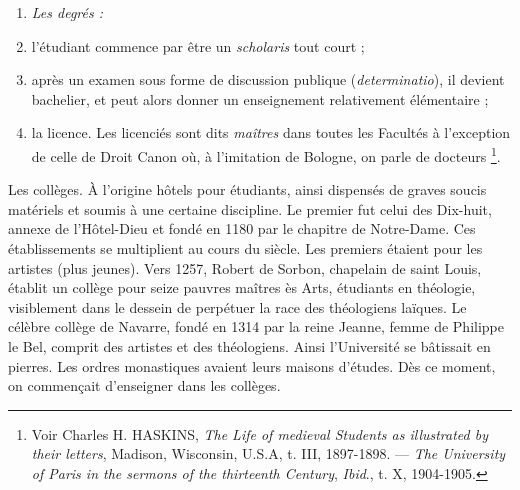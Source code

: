 \documentclass[french,twoside]{book} %
\newlength{\listmod}
\newcommand{\listhead}[1]{\hspace{-1\listmod}\emph{#1}}
\def\bignobreak{\ifdim\lastskip<\bigskipamount
  \removelastskip\nopagebreak\bigskip\fi}
\newcommand{\labelblock}[1]{\bigbreak{\color{rubric}\noindent\textbf{#1}\par}\bignobreak}
\begin{document}
\begin{enumerate}[itemsep=0pt,]
\item[]\listhead{Les degrés :}
\item l’étudiant commence par être un {\itshape scholaris} tout court ;
\item après un examen sous forme de discussion publique ({\itshape determinatio}), il devient bachelier, et peut alors donner un enseignement relativement élémentaire ;
\item la licence. Les licenciés sont dits \emph{maîtres} dans toutes les Facultés à l’exception de celle de Droit Canon où, à l’imitation de Bologne, on parle de docteurs \footnote{ Voir Charles H. HASKINS, {\itshape The Life of medieval Students as illustrated by their letters}, Madison, Wisconsin, U.S.A, t. III, 1897-1898. — {\itshape The University of Paris in the sermons of the thirteenth Century}, {\itshape Ibid}., t. X, 1904-1905.}.

\end{enumerate}\noindent Les collèges. À l’origine hôtels pour étudiants, ainsi dispensés de graves soucis matériels et soumis à une certaine discipline. Le premier fut celui des Dix-huit, annexe de l’Hôtel-Dieu et fondé en 1180 par le chapitre de Notre-Dame. Ces établissements se multiplient au cours du siècle. Les premiers étaient pour les artistes (plus jeunes). Vers 1257, Robert de Sorbon, chapelain de saint Louis, établit un collège pour seize pauvres maîtres ès Arts, étudiants en théologie, visiblement dans le dessein de perpétuer la race des théologiens laïques. Le célèbre collège de Navarre, fondé en 1314 par la reine Jeanne, femme de Philippe le Bel, comprit des artistes et des théologiens. Ainsi l’Université se bâtissait en pierres. Les ordres monastiques avaient leurs maisons d’études. Dès ce moment, on commençait d’enseigner dans les collèges.\par

\labelblock{Les ordres mendiants.}
\end{document}
